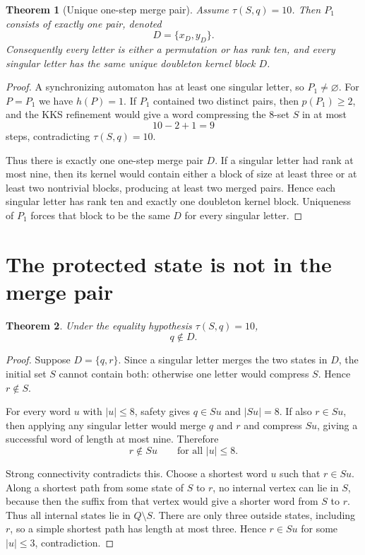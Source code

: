 \documentclass[11pt]{article}
\newtheorem{theorem}{Theorem}
\theoremstyle{definition}
\theoremstyle{remark}
\begin{document}
\begin{theorem}[Unique one-step merge pair]\label{thm:uniqueD}
Assume $\tau(S,q)=10$. Then $P_1$ consists of exactly one pair, denoted
\[
D=\{x_D,y_D\}.
\]
Consequently every letter is either a permutation or has rank ten, and every singular letter has the same unique doubleton kernel block $D$.
\end{theorem}
\begin{proof}
A synchronizing automaton has at least one singular letter, so $P_1\ne\varnothing$. For $P=P_1$ we have $h(P)=1$. If $P_1$ contained two distinct pairs, then $p(P_1)\ge2$, and the KKS refinement would give a word compressing the 8-set $S$ in at most
\[
10-2+1=9
\]
steps, contradicting $\tau(S,q)=10$.

Thus there is exactly one one-step merge pair $D$. If a singular letter had rank at most nine, then its kernel would contain either a block of size at least three or at least two nontrivial blocks, producing at least two merged pairs. Hence each singular letter has rank ten and exactly one doubleton kernel block. Uniqueness of $P_1$ forces that block to be the same $D$ for every singular letter.
\end{proof}

\section{The protected state is not in the merge pair}
\begin{theorem}\label{thm:qnotD}
Under the equality hypothesis $\tau(S,q)=10$,
\[
q\notin D.
\]
\end{theorem}
\begin{proof}
Suppose $D=\{q,r\}$. Since a singular letter merges the two states in $D$, the initial set $S$ cannot contain both: otherwise one letter would compress $S$. Hence $r\notin S$.

For every word $u$ with $|u|\le8$, safety gives $q\in Su$ and $|Su|=8$. If also $r\in Su$, then applying any singular letter would merge $q$ and $r$ and compress $Su$, giving a successful word of length at most nine. Therefore
\[
r\notin Su\qquad\text{for all }|u|\le8.
\]

Strong connectivity contradicts this. Choose a shortest word $u$ such that $r\in Su$. Along a shortest path from some state of $S$ to $r$, no internal vertex can lie in $S$, because then the suffix from that vertex would give a shorter word from $S$ to $r$. Thus all internal states lie in $Q\setminus S$. There are only three outside states, including $r$, so a simple shortest path has length at most three. Hence $r\in Su$ for some $|u|\le3$, contradiction.
\end{proof}
\end{document}
